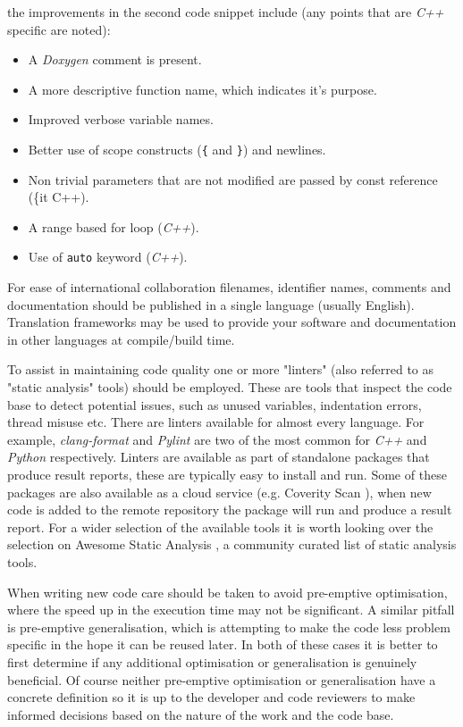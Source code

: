 \documentclass[jnr]{iosart2x}
\begin{document}
the improvements in the second code snippet include (any points that are {\it C++} specific are noted):
\begin{itemize}
  \item{A {\it Doxygen} \cite{doxygen} comment is present.}
  \item{A more descriptive function name, which indicates it's purpose.}
  \item{Improved verbose variable names.}
  \item{Better use of scope constructs (\texttt{\{} and \texttt{\}}) and newlines.}
  \item{Non trivial parameters that are not modified are passed by const reference (\{it C++}).
  \item{A range based for loop ({\it C++}).}
  \item{Use of \texttt{auto} keyword ({\it C++}).}
\end{itemize}

For ease of international collaboration filenames, identifier names, comments and documentation should be published in a single language (usually English).
Translation frameworks may be used to provide your software and documentation in other languages at compile/build time.

To assist in maintaining code quality one or more "linters" (also referred to as "static analysis" tools) should be employed.
These are tools that inspect the code base to detect potential issues, such as unused variables, indentation errors, thread misuse etc.
There are linters available for almost every language.
For example, {\it clang-format} \cite{Clang} and {\it Pylint} \cite{Pylint} are two of the most common for {\it C++} and {\it Python} respectively.
Linters are available as part of standalone packages that produce result reports, these are typically easy to install and run.
Some of these packages are also available as a cloud service (e.g. Coverity Scan \cite{coverity}), when new code is added to the remote repository the package will run and produce a result report.
For a wider selection of the available tools it is worth looking over the selection on Awesome Static Analysis \cite{awesome_static_analysis}, a community curated list of static analysis tools.

When writing new code care should be taken to avoid pre-emptive optimisation, where the speed up in the execution time may not be significant.
A similar pitfall is pre-emptive generalisation, which is attempting to make the code less problem specific in the hope it can be reused later.
In both of these cases it is better to first determine if any additional optimisation or generalisation is genuinely beneficial.
Of course neither pre-emptive optimisation or generalisation have a concrete definition so it is up to the developer and code reviewers to make informed decisions based on the nature of the work and the code base.
\end{document}

